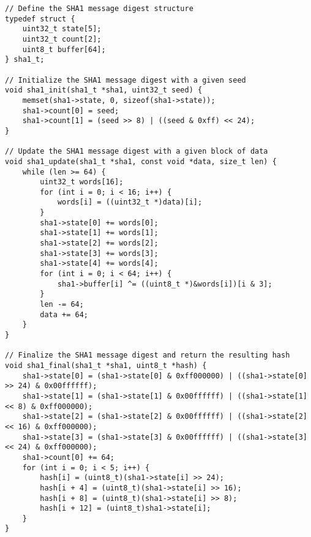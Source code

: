 \begin{lstlisting}[style=C, caption={Key Expansion in C (General ver.)},captionpos=t]
// Define the SHA1 message digest structure
typedef struct {
	uint32_t state[5];
	uint32_t count[2];
	uint8_t buffer[64];
} sha1_t;

// Initialize the SHA1 message digest with a given seed
void sha1_init(sha1_t *sha1, uint32_t seed) {
	memset(sha1->state, 0, sizeof(sha1->state));
	sha1->count[0] = seed;
	sha1->count[1] = (seed >> 8) | ((seed & 0xff) << 24);
}

// Update the SHA1 message digest with a given block of data
void sha1_update(sha1_t *sha1, const void *data, size_t len) {
	while (len >= 64) {
		uint32_t words[16];
		for (int i = 0; i < 16; i++) {
			words[i] = ((uint32_t *)data)[i];
		}
		sha1->state[0] += words[0];
		sha1->state[1] += words[1];
		sha1->state[2] += words[2];
		sha1->state[3] += words[3];
		sha1->state[4] += words[4];
		for (int i = 0; i < 64; i++) {
			sha1->buffer[i] ^= ((uint8_t *)&words[i])[i & 3];
		}
		len -= 64;
		data += 64;
	}
}

// Finalize the SHA1 message digest and return the resulting hash
void sha1_final(sha1_t *sha1, uint8_t *hash) {
	sha1->state[0] = (sha1->state[0] & 0xff000000) | ((sha1->state[0] >> 24) & 0x00ffffff);
	sha1->state[1] = (sha1->state[1] & 0x00ffffff) | ((sha1->state[1] << 8) & 0xff000000);
	sha1->state[2] = (sha1->state[2] & 0x00ffffff) | ((sha1->state[2] << 16) & 0xff000000);
	sha1->state[3] = (sha1->state[3] & 0x00ffffff) | ((sha1->state[3] << 24) & 0xff000000);
	sha1->count[0] += 64;
	for (int i = 0; i < 5; i++) {
		hash[i] = (uint8_t)(sha1->state[i] >> 24);
		hash[i + 4] = (uint8_t)(sha1->state[i] >> 16);
		hash[i + 8] = (uint8_t)(sha1->state[i] >> 8);
		hash[i + 12] = (uint8_t)sha1->state[i];
	}
}
\end{lstlisting}
